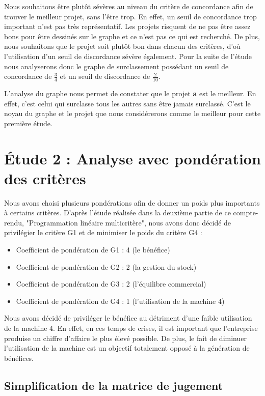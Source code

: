 \documentclass[a4paper,10pt]{article}
\begin{document}
Nous souhaitons être plutôt sévères au niveau du critère de concordance afin de trouver le meilleur projet, sans l'être trop. En effet, un seuil de concordance trop important n'est pas très représentatif. Les projets risquent de ne pas être assez bons pour être dessinés sur le graphe et ce n'est pas ce qui est recherché. De plus, nous souhaitons que le projet soit plutôt bon dans chacun des critères, d'où l'utilisation d'un seuil de discordance sévère également. Pour la suite de l'étude nous analyserons donc le graphe de surclassement  possédant un seuil de concordance de $\frac{3}{4}$ et un seuil de discordance de $\frac{2}{10}$.

L'analyse du graphe  nous permet de constater que le projet \textbf{a} est le meilleur. En effet, c'est celui qui surclasse tous les autres sans être jamais surclassé. C'est le noyau du graphe et le projet que nous considérerons comme le meilleur pour cette première étude.

\section{Étude 2 : Analyse avec pondération des critères}

Nous avons choisi plusieurs pondérations afin de donner un poids plus importants à certains critères. D'après l'étude réalisée dans la deuxième partie de ce compte-rendu, "Programmation linéaire multicritère", nous avons donc décidé de privilégier le critère G1 et de minimiser le poids du critère G4 :

\begin{itemize}
\item Coefficient de pondération de G1 : 4 (le bénéfice)
\item Coefficient de pondération de G2 : 2 (la gestion du stock)
\item Coefficient de pondération de G3 : 2 (l'équilibre commercial)
\item Coefficient de pondération de G4 : 1 (l'utilisation de la machine 4)
\end{itemize}

Nous avons décidé de priviléger le bénéfice au détriment d'une faible utilisation de la machine 4. En effet, en ces temps de crises, il est important que l'entreprise produise un chiffre d'affaire le plus élevé possible. De plus, le fait de diminuer l'utilisation de la machine est un objectif totalement opposé à la génération de bénéfices.

\subsection{Simplification de la matrice de jugement}
\end{document}
